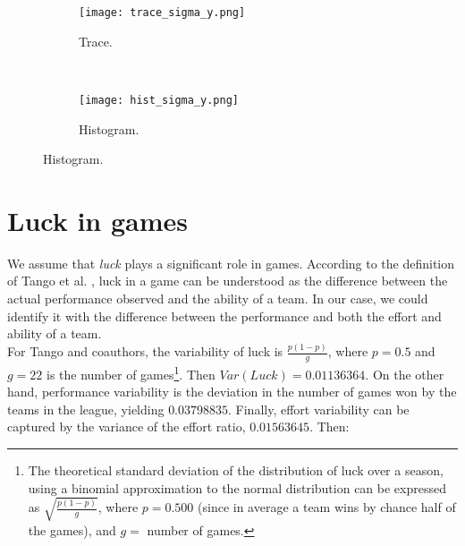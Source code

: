 \documentclass[]{article}
\begin{document}
\begin{figure}[hbt!]
	\centering
	\caption{Trace and Histogram of Sigma}		
	\begin{subfigure}[t]{0.47\textwidth}
		\centering
		\scriptsize
		\texttt{[image: trace\_sigma\_y.png]}
		\caption{Trace. \label{fig:effvshome}}
	\end{subfigure}%
	~ 
	\begin{subfigure}[t]{0.47\textwidth}
		\centering
		\scriptsize
		\texttt{[image: hist\_sigma\_y.png]}
		\caption{Histogram. \label{fig:effvprev}}
	\end{subfigure}
	\label{tracesigma}
\end{figure}





\section{Luck in games}
We assume that {\em luck} plays a significant role in games. According to the definition of Tango et al. \cite{tango2007book}, luck in a game can be understood as the difference between the actual performance observed and the ability of a team. In our case, we could identify it with the difference between the performance and both the effort and ability of a team. \\

For Tango and coauthors, the variability of luck is $\frac{p (1-p)}{g} $, where $ p = 0.5 $ and $ g = 22 $ is the number of games\footnote{The theoretical standard deviation of the distribution of luck over a season, using a binomial approximation to the normal distribution can be expressed as $\sqrt{\frac{p(1-p)}{g}}$, where $p = 0.500$ (since in average a team wins by chance half of the games), and $g =$ number of games.}. Then $Var(Luck) = 0.01136364 $. On the other hand, performance variability is the deviation in the number of games won by the teams in the league, yielding $ 0.03798835 $. Finally, effort variability can be captured by the variance of the effort ratio, $ 0.01563645 $. Then: 
\end{document}
